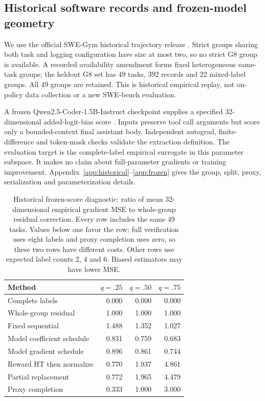 \subsection{Historical software records and frozen-model geometry}\label{sec:frozen}
We use the official SWE-Gym historical trajectory release \citep{pan2025,swegymdata}. Strict groups sharing both task and logging configuration have size at most two, so no strict G8 group is available. A recorded availability amendment forms fixed heterogeneous same-task groups; the heldout G8 set has 49 tasks, 392 records and 22 mixed-label groups. All 49 groups are retained. This is historical empirical replay, not on-policy data collection or a new SWE-bench evaluation.

A frozen Qwen2.5-Coder-1.5B-Instruct checkpoint supplies a specified 32-dimensional added-logit-bias score \citep{qwenmodel}. Inputs preserve tool call arguments but score only a bounded-context final assistant body. Independent autograd, finite-difference and token-mask checks validate the extraction definition. The evaluation target is the complete-label empirical surrogate in this parameter subspace. It makes no claim about full-parameter gradients or training improvement. Appendix~\ref{app:historical}--\ref{app:frozen} gives the group, split, proxy, serialization and parameterization details.

\begin{table}[t]
\centering\small
\begin{tabular}{lrrr}
\toprule
Method & $q=.25$ & $q=.50$ & $q=.75$\\
\midrule
Complete labels & 0.000 & 0.000 & 0.000 \\
Whole-group residual & 1.000 & 1.000 & 1.000 \\
Fixed sequential & 1.488 & 1.352 & 1.027 \\
Model coefficient schedule & 0.831 & 0.759 & 0.683 \\
Model gradient schedule & 0.896 & 0.861 & 0.744 \\
Reward HT then normalize & 0.770 & 1.937 & 4.861 \\
Partial replacement & 0.772 & 1.965 & 4.479 \\
Proxy completion & 0.333 & 1.000 & 3.000 \\
\bottomrule
\end{tabular}
\caption{Historical frozen-score diagnostic: ratio of mean 32-dimensional empirical gradient MSE to whole-group residual correction. Every row includes the same 49 tasks. Values below one favor the row; full verification uses eight labels and proxy completion uses zero, so these two rows have different costs. Other rows use expected label counts 2, 4 and 6. Biased estimators may have lower MSE.}\label{tab:frozen}
\end{table}

